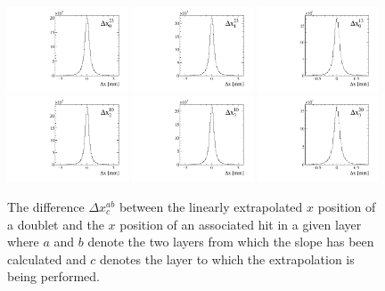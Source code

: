 \begin{figure}[!htb]
\centering
\includegraphics[width=0.32\textwidth]{figs/upstream-tracking-upgrade/dx0.pdf}
\includegraphics[width=0.32\textwidth]{figs/upstream-tracking-upgrade/dx1.pdf}
\includegraphics[width=0.32\textwidth]{figs/upstream-tracking-upgrade/dx0b.pdf}
\includegraphics[width=0.32\textwidth]{figs/upstream-tracking-upgrade/dx2.pdf}
\includegraphics[width=0.32\textwidth]{figs/upstream-tracking-upgrade/dx3.pdf}
\includegraphics[width=0.32\textwidth]{figs/upstream-tracking-upgrade/dx3b.pdf}
\caption{The difference $\Delta x_{c}^{ab}$ between the linearly extrapolated $x$ position of a doublet and the $x$ position of an associated hit in a given layer where $a$ and $b$ denote the two layers from which the slope has been calculated and $c$ denotes the layer to which the extrapolation is being performed.}
\label{fig:clustering_tolerance}
\end{figure}


